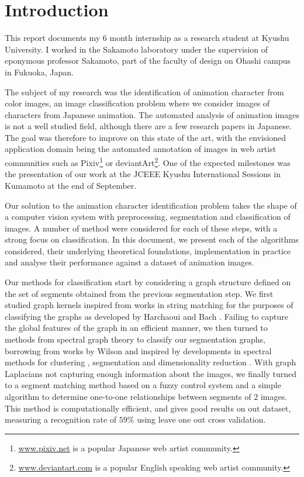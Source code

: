 \section*{Introduction}
This report documents my $6$ month internship as a research student at Kyushu University. I worked in the Sakamoto laboratory under the supervision of eponymous professor Sakamoto, part of the faculty of design on Ohashi campus in Fukuoka, Japan.

The subject of my research was the identification of animation character from color images, an image classification problem where we consider images of characters from Japanese animation. The automated analysis of animation images is not a well studied field, although there are a few research papers in Japanese. The goal was therefore to improve on this state of the art, with the envisioned application domain being the automated annotation of images in web artist communities such as Pixiv\footnote{
\url{www.pixiv.net} is a popular Japanese web artist community.
} or deviantArt\footnote{
\url{www.deviantart.com} is a popular English speaking web artist community.
}. One of the expected milestones was the presentation of our work at the JCEEE Kyushu International Sessions in Kumamoto at the end of September.

Our solution to the animation character identification problem takes the shape of a computer vision system with preprocessing, segmentation and classification of images. A number of method were considered for each of these steps, with a strong focus on classification. In this document, we present each of the algorithms considered, their underlying theoretical foundations, implementation in practice and analyse their performance against a dataset of animation images.

Our methods for classification start by considering a graph structure defined on the set of segments obtained from the previous segmentation step. We first studied graph kernels inspired from works in string matching for the purposes of classifying the graphs as developed by Harchaoui and Bach \cite{harchaoui2007image}. Failing to capture the global features of the graph in an efficient manner, we then turned to methods from spectral graph theory to classify our segmentation graphs, borrowing from works by Wilson \cite{harchaoui2007image}
\cite{wilson2005pattern} and inspired by developments in spectral methods for clustering \cite{ng2002spectral}, segmentation \cite{shi2000normalized} and dimensionality reduction \cite{roweis2000nonlinear} \cite{belkin2003laplacian}. With graph Laplacians not capturing enough information about the images, we finally turned to a segment matching method based on a fuzzy control system and a simple algorithm to determine one-to-one relationships between segments of $2$ images. This method is computationally efficient, and gives good results on out dataset, measuring a recognition rate of $59$\% using leave one out cross validation.

